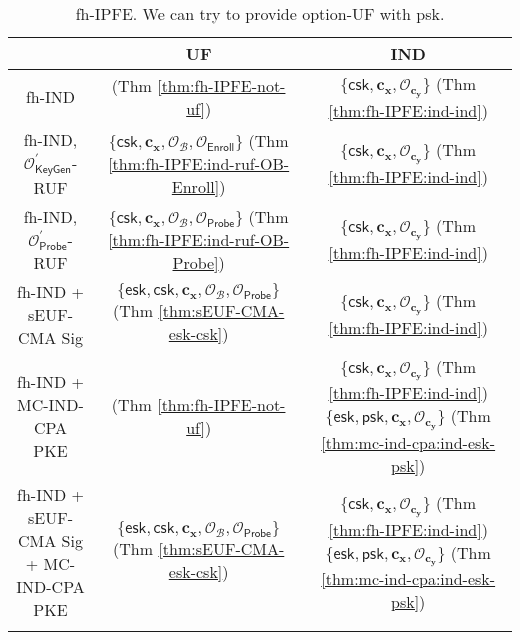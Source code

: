 \begin{table}[ht]
\centering
\begin{tabular}{c c c} 
	
	\toprule

	& \textbf{UF} & \textbf{IND} \\
	
	\midrule

	\textsf{fh-IND} & \xmark \; (Thm \ref{thm:fh-IPFE-not-uf}) & $\{ \textsf{csk}, \mathbf{c_x},  \mathcal{O}_{\mathbf{c_y}} \}$ (Thm \ref{thm:fh-IPFE:ind-ind}) \\
	
	\midrule
	
	\textsf{fh-IND}, $\mathcal{O}^\prime_{\textsf{KeyGen}}$-RUF & $\{ \textsf{csk}, \mathbf{c_x}, \mathcal{O}_\mathcal{B}, \mathcal{O}_{\textsf{Enroll}} \}$ (Thm \ref{thm:fh-IPFE:ind-ruf-OB-Enroll}) & $\{ \textsf{csk}, \mathbf{c_x},  \mathcal{O}_{\mathbf{c_y}} \}$ (Thm \ref{thm:fh-IPFE:ind-ind}) \\
	
	\midrule
	
	\textsf{fh-IND}, $\mathcal{O}^\prime_{\textsf{Probe}}$-RUF & $\{ \textsf{csk}, \mathbf{c_x}, \mathcal{O}_\mathcal{B}, \mathcal{O}_{\textsf{Probe}} \}$ (Thm \ref{thm:fh-IPFE:ind-ruf-OB-Probe}) & $\{ \textsf{csk}, \mathbf{c_x},  \mathcal{O}_{\mathbf{c_y}} \}$ (Thm \ref{thm:fh-IPFE:ind-ind}) \\
	
	\midrule
	
	\textsf{fh-IND} + sEUF-CMA \textsf{Sig} & $\{ \textsf{esk}, \textsf{csk}, \mathbf{c_x}, \mathcal{O}_\mathcal{B}, \mathcal{O}_{\textsf{Probe}} \}$ (Thm \ref{thm:sEUF-CMA-esk-csk}) & $\{ \textsf{csk}, \mathbf{c_x},  \mathcal{O}_{\mathbf{c_y}} \}$ (Thm \ref{thm:fh-IPFE:ind-ind}) \\
	
	\midrule
	
	\textsf{fh-IND} + MC-IND-CPA \textsf{PKE} & \xmark \; (Thm \ref{thm:fh-IPFE-not-uf})  & \makecell{$\{ \textsf{csk}, \mathbf{c_x},  \mathcal{O}_{\mathbf{c_y}} \}$ (Thm \ref{thm:fh-IPFE:ind-ind}) \\ $\{ \textsf{esk}, \textsf{psk}, \mathbf{c_x}, \mathcal{O}_{\mathbf{c_y}} \}$ (Thm \ref{thm:mc-ind-cpa:ind-esk-psk})} \\
	
	\midrule
	
	\makecell{\textsf{fh-IND} + sEUF-CMA \textsf{Sig} \\ + MC-IND-CPA \textsf{PKE}} & $\{ \textsf{esk}, \textsf{csk}, \mathbf{c_x}, \mathcal{O}_\mathcal{B}, \mathcal{O}_{\textsf{Probe}} \}$ (Thm \ref{thm:sEUF-CMA-esk-csk}) & \makecell{$\{ \textsf{csk}, \mathbf{c_x},  \mathcal{O}_{\mathbf{c_y}} \}$ (Thm \ref{thm:fh-IPFE:ind-ind}) \\ $\{ \textsf{esk}, \textsf{psk}, \mathbf{c_x}, \mathcal{O}_{\mathbf{c_y}} \}$ (Thm \ref{thm:mc-ind-cpa:ind-esk-psk})} \\
	
	\bottomrule

\medskip
\end{tabular}
\caption{fh-IPFE. We can try to provide \textsf{option}-UF with \textsf{psk}.}
\label{table:fh-IPFE}
\end{table}
